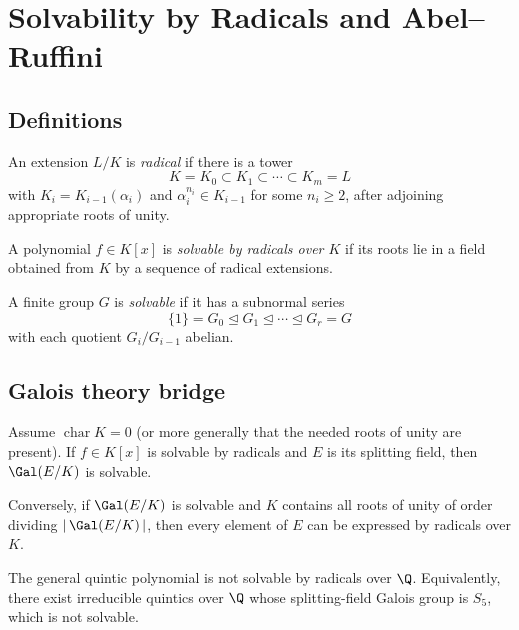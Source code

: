 \section{Solvability by Radicals and Abel--Ruffini}

\subsection{Definitions}

\begin{definition}
An extension $L/K$ is \emph{radical} if there is a tower
\[
K=K_0\subset K_1\subset\cdots\subset K_m=L
\]
with $K_{i}=K_{i-1}(\alpha_i)$ and $\alpha_i^{n_i}\in K_{i-1}$ for some $n_i\ge2$, after adjoining appropriate roots of unity.
\end{definition}

\begin{definition}
A polynomial $f\in K[x]$ is \emph{solvable by radicals over $K$} if its roots lie in a field obtained from $K$ by a sequence of radical extensions.
\end{definition}

\begin{definition}
A finite group $G$ is \emph{solvable} if it has a subnormal series
\[
\{1\}=G_0\trianglelefteq G_1\trianglelefteq\cdots\trianglelefteq G_r=G
\]
with each quotient $G_{i}/G_{i-1}$ abelian.
\end{definition}

\subsection{Galois theory bridge}

\begin{theorem}
Assume $\operatorname{char}K=0$ (or more generally that the needed roots of unity are present). If $f\in K[x]$ is solvable by radicals and $E$ is its splitting field, then $\Gal(E/K)$ is solvable.
\end{theorem}

\begin{theorem}
Conversely, if $\Gal(E/K)$ is solvable and $K$ contains all roots of unity of order dividing $|\,\Gal(E/K)\,|$, then every element of $E$ can be expressed by radicals over $K$.
\end{theorem}

\begin{corollary}
The general quintic polynomial is not solvable by radicals over $\Q$. Equivalently, there exist irreducible quintics over $\Q$ whose splitting-field Galois group is $S_5$, which is not solvable.
\end{corollary}

